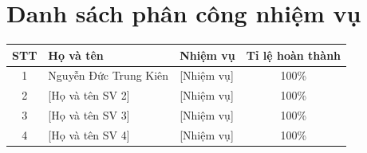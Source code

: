\newpage
\thispagestyle{empty}

\section*{Danh sách phân công nhiệm vụ}

\begin{table}[h]
\centering
\begin{tabular}{|c|l|l|c|}
\hline
\textbf{STT} & \textbf{Họ và tên} & \textbf{Nhiệm vụ} & \textbf{Tỉ lệ hoàn thành} \\
\hline
1 & Nguyễn Đức Trung Kiên & [Nhiệm vụ] & 100\% \\
\hline
2 & [Họ và tên SV 2] & [Nhiệm vụ] & 100\% \\
\hline
3 & [Họ và tên SV 3] & [Nhiệm vụ] & 100\% \\
\hline
4 & [Họ và tên SV 4] & [Nhiệm vụ] & 100\% \\
\hline
\end{tabular}
\end{table}

\newpage
\tableofcontents
\newpage
